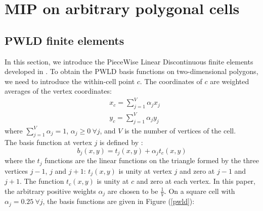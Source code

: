 \section{MIP on arbitrary polygonal cells} \label{sec_mip}
\subsection{PWLD finite elements}
In this section, we introduce the PieceWise Linear Discontinuous finite
elements developed in \cite{pwld_3d,pwld_2d}. To obtain the PWLD basis
functions on two-dimensional polygons, we need to introduce the within-cell
point $c$. The coordinates of $c$ are weighted averages of the vertex coordinates:
\begin{align}
& x_c = \sum_{j=1}^{V} \alpha_{j} x_j\\
& y_c = \sum_{j=1}^{V} \alpha_{j} y_j
\end{align}
where $\sum_{j=1}^{V} \alpha_{j}=1$, $\alpha_j \geq 0\ \forall j$, and $V$ is 
the number of vertices of the cell.\\
The basis function at vertex $j$ is defined by \cite{pwld_2d}:
\begin{equation}
b_{j} (x,y) = t_{j}(x,y) + \alpha_j t_c(x,y)
\end{equation}
where the $t_j$ functions are the linear functions on the triangle formed
by the three vertices $j-1$, $j$ and $j+1$: $t_j (x,y)$ is unity at vertex $j$
and zero at $j-1$ and $j+1$. The function $t_c(x,y)$ is unity at $c$ 
and zero at each vertex. In this paper, the arbitrary positive weights
$\alpha_j$ are chosen to be $\frac{1}{V}$. On a square cell with 
$\alpha_{j}=0.25\ \forall j$, the basis functions are given in Figure (\ref{pwld}):
